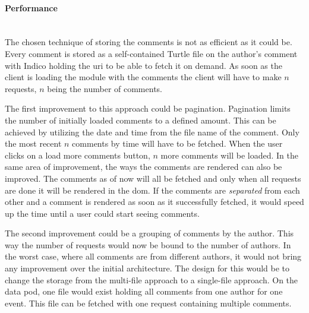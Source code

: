 \vspace{0.5cm}
\paragraph{Performance}\label{paragraph:evaluation-performance}\mbox{}\\

The chosen technique of storing the comments is not as efficient as it could be. Every comment is stored as a self-contained Turtle file on the author's comment with Indico holding the \gls{uri} to be able to fetch it on demand. As soon as the client is loading the module with the comments the client will have to make $n$ requests, $n$ being the number of comments.

The first improvement to this approach could be pagination. Pagination limits the number of initially loaded comments to a defined amount. This can be achieved by utilizing the date and time from the file name of the comment. Only the most recent $n$ comments by time will have to be fetched. When the user clicks on a load more comments button, $n$ more comments will be loaded.
In the same area of improvement, the ways the comments are rendered can also be improved. The comments as of now will all be fetched and only when all requests are done it will be rendered in the \gls{dom}. If the comments are \textit{separated} from each other and a comment is rendered as soon as it successfully fetched, it would speed up the time until a user could start seeing comments.

The second improvement could be a grouping of comments by the author. This way the number of requests would now be bound to the number of authors. In the worst case, where all comments are from different authors, it would not bring any improvement over the initial architecture. The design for this would be to change the storage from the multi-file approach to a single-file approach. On the data pod, one file would exist holding all comments from one author for one event. This file can be fetched with one request containing multiple comments.

